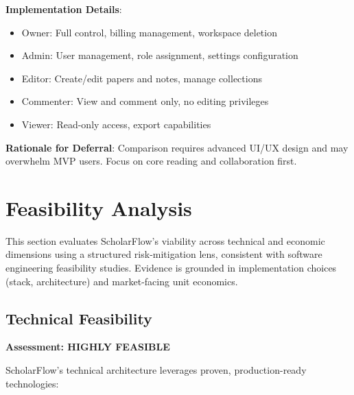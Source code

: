 \textbf{Implementation Details}:
\begin{itemize}
    \item Owner: Full control, billing management, workspace deletion
    \item Admin: User management, role assignment, settings configuration
    \item Editor: Create/edit papers and notes, manage collections
    \item Commenter: View and comment only, no editing privileges
    \item Viewer: Read-only access, export capabilities
\end{itemize}
\textbf{Rationale for Deferral}: Comparison requires advanced UI/UX design and may overwhelm MVP users. Focus on core reading and collaboration first.

\section{Feasibility Analysis}

This section evaluates ScholarFlow's viability across technical and economic dimensions using a structured risk-mitigation lens, consistent with software engineering feasibility studies. Evidence is grounded in implementation choices (stack, architecture) and market-facing unit economics.

\subsection{Technical Feasibility}

\textbf{Assessment: HIGHLY FEASIBLE}

ScholarFlow's technical architecture leverages proven, production-ready technologies:

